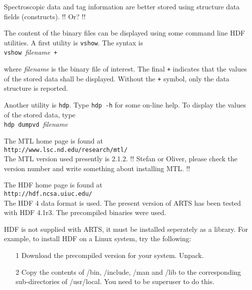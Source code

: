  \label{sec:formats:file:binary:others}

 Spectroscopic data and tag information are better stored using
 structure data fields (constructs). !! Or? !!


 \label{sec:formats:file:binary:display}

 The content of the binary files can be displayed using some command
 line HDF utilities. A first utility is
 \verb|vshow|. The syntax is \\

 \verb|vshow |{\it filename}\verb| +|

 \noindent
 where {\it filename} is the binary file of interest. The final \verb|+|
 indicates that the values of the stored data shall be displayed. Without
 the \verb|+| symbol, only the data structure is reported.

 Another utility is \verb|hdp|. Type \verb|hdp -h| for some on-line help.
 To display the values of the stored data, type\\
 
 \verb|hdp dumpvd |{\it filename}



 \label{sec:formats:mtl}

 The MTL home page is found at \\

 \verb|http://www.lsc.nd.edu/research/mtl/| \\

 \noindent
 The MTL version used presently is 2.1.2. !! Stefan or Oliver, please check
 the version number and write something about installing MTL. !!


 \label{sec:formats:hdf}

 The HDF home page is found at \\

 \verb|http://hdf.ncsa.uiuc.edu/| \\

 \noindent
 The HDF 4 data format is used. The present version of ARTS has been
 tested with HDF 4.1r3. The precompiled binaries were used.
 
 HDF is not supplied with ARTS, it must be installed seperately as a
 library. For example, to install HDF on a Linux system, try the
 following:
 \begin{itemize}
  \item[1] Download the precompiled version for your system. Unpack.
  \item[2] Copy the contents of /bin, /include, /man and /lib to the 
           corresponding sub-directories of /usr/local. You need to be 
           superuser to do this.  
 \end{itemize}



